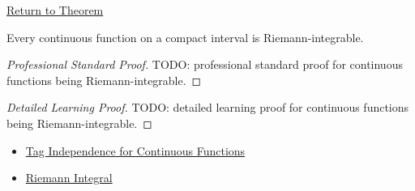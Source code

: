\newpage
{}
\label{prf:continuous-riemann-integrable}

\begin{remark*}[Return]
\hyperref[thm:continuous-riemann-integrable]{Return to Theorem}
\end{remark*}

\begin{theorem*}
Every continuous function on a compact interval is Riemann-integrable.
\end{theorem*}

\begin{proof}[Professional Standard Proof]
\LRAProofBodyStart
TODO: professional standard proof for continuous functions being Riemann-integrable.
\end{proof}

\begin{proof}[Detailed Learning Proof]
\LRAProofBodyStart
TODO: detailed learning proof for continuous functions being Riemann-integrable.
\end{proof}

\begin{remark*}
\end{remark*}

\begin{dependencies}
\begin{itemize}
  \item \hyperref[thm:cauchy-tag-independence]{Tag Independence for Continuous Functions}
  \item \hyperref[def:riemann-integral]{Riemann Integral}
\end{itemize}
\end{dependencies}

\clearpage

